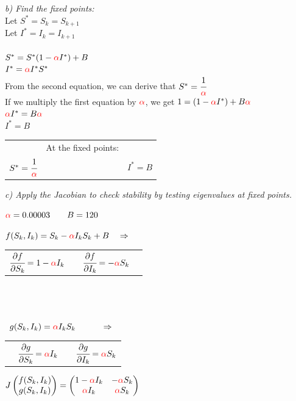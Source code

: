 \documentclass[12pt]{article}
\begin{document}
\textit{b) Find the fixed points:}\\
Let $S^* = S_k = S_{k+1}$\\
Let $I^* = I_k = I_{k+1}$\\\\
$S^* = S^*(1 - \textcolor{red} {\alpha} I^*) + B$\\
$I^* = \textcolor{red} {\alpha} I^* S^*$\\
From the second equation, we can derive that $S^* = \cfrac{1}{\textcolor{red} {\alpha}}$\\
If we multiply the first equation by $\textcolor{red} {\alpha}$, we get $1 = (1 - \textcolor{red} {\alpha} I^*) + B\textcolor{red} {\alpha}$\\
$\textcolor{red} {\alpha} I^* =B\textcolor{red} {\alpha}$\\
$I^* = B$
\begin{center}
\begin{tabular}{ c c c } 
& At the fixed points: &\\
$S^* = \cfrac{1}{\textcolor{red} {\alpha}}$ & & $I^* = B$\\
\end{tabular}
\end{center}
\break
\textit{c) Apply the Jacobian to check stability by testing eigenvalues at fixed points.}
\begin{center}
$\textcolor{red} {\alpha} = 0.00003 \qquad B = 120$\\
\end{center}
$f(S_k,I_k) = S_k - \textcolor{red} {\alpha} I_k S_k + B \quad \Rightarrow \quad$
\begin{tabular}{c c c}
$\cfrac{\partial f}{\partial S_k} = 1 - \textcolor{red} {\alpha} I_k$ &  $\quad \cfrac{\partial f}{\partial I_k} = -\textcolor{red} {\alpha} S_k$\\
\end{tabular}
\\\\\\\
$g(S_k,I_k) = \textcolor{red} {\alpha} I_k S_k \quad \qquad \Rightarrow \qquad$
\begin{tabular}{c c}
$\quad \cfrac{\partial g}{\partial S_k} = \textcolor{red} {\alpha} I_k$ & $\quad \cfrac{\partial g}{\partial I_k} = \textcolor{red} {\alpha} S_k$\\
\end{tabular}
\begin{center}
$J
\begin{pmatrix}
f(S_k,I_k)\\
g(S_k,I_k)\\
\end{pmatrix}
= \begin{pmatrix}
1-\textcolor{red} {\alpha} I_k & -\textcolor{red} {\alpha} S_k\\
\textcolor{red} {\alpha} I_k & \textcolor{red} {\alpha} S_k\\
\end{pmatrix}$
\end{center}
\end{document}
